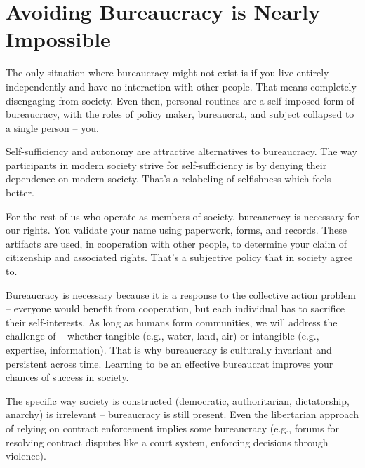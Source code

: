 

\section{Avoiding Bureaucracy is Nearly Impossible}

The only situation where bureaucracy might not exist is if you live entirely independently and have no interaction with other people. That means completely disengaging from society. Even then, personal routines are a self-imposed form of bureaucracy, with the roles of policy maker, bureaucrat, and subject collapsed to a single person -- you.

Self-sufficiency and autonomy are attractive alternatives to bureaucracy. The way participants in modern society strive for self-sufficiency is by denying their dependence on modern society. That's a relabeling of selfishness which feels better. 

For the rest of us who operate as members of  society, bureaucracy is necessary for our rights. You validate your name using paperwork, forms, and records. These artifacts are used, in cooperation with other people, to determine your claim of citizenship and associated rights. 
That's a subjective policy that \iftoggle{glossarysubstitutionworks}{\glspl{stakeholder}}{stakeholders} in society agree to. 


Bureaucracy is necessary because it is a response to the \iftoggle{WPinmargin}{\marginpar{$>$Wikipedia: Collective action problem}}{}
\href{https://en.wikipedia.org/wiki/Collective_action_problem}{collective action problem} -- everyone would benefit from cooperation, but each individual has to sacrifice their self-interests.  
As long as humans form communities, we will address the challenge of \iftoggle{glossarysubstitutionworks}{\glspl{shared resource}}{shared resources}
 -- whether tangible (e.g., water, land, air) or intangible (e.g., expertise, information). 
That is why bureaucracy is culturally invariant and persistent across time.
Learning to be an effective bureaucrat improves your chances of success in society. 

The specific way society is constructed (democratic, authoritarian, dictatorship, anarchy) is irrelevant -- bureaucracy is still present. Even the libertarian approach of relying on contract enforcement implies some bureaucracy (e.g., forums for resolving contract disputes like a court system, enforcing decisions through violence). 


